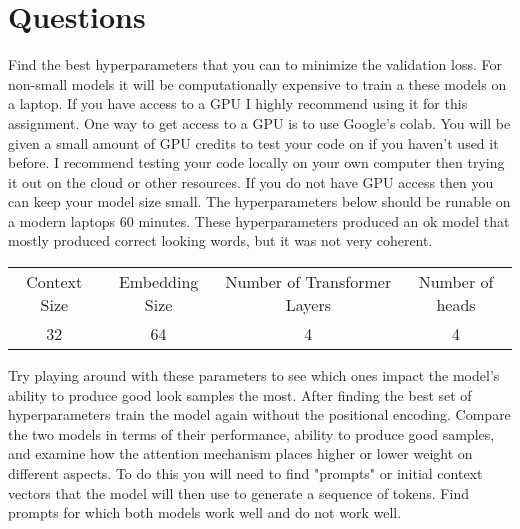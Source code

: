 \documentclass{article}
\begin{document}
\section{Questions}
Find the best hyperparameters that you can to minimize the validation loss. For non-small models it will be computationally expensive to train a these models on a laptop. If you have access to a GPU I highly recommend using it for this assignment. One way to get access to a GPU is to use Google's colab. You will be given a small amount of GPU credits to test your code on if you haven't used it before. I recommend testing your code locally on your own computer then trying it out on the cloud or other resources. If you do not have GPU access then you can keep your model size small. The hyperparameters below should be runable on a modern laptops 60 minutes. These hyperparameters produced an ok model that mostly produced correct looking words, but it was not very coherent. 
\begin{center}
\begin{tabular}{c|c|c|c}
    Context Size & Embedding Size & Number of Transformer Layers & Number of heads \\
    32 & 64 & 4 & 4 
\end{tabular}
\end{center}
Try playing around with these parameters to see which ones impact the model's ability to produce good look samples the most. 
%
After finding the best set of hyperparameters train the model again without the positional encoding. Compare the two models in terms of their performance, ability to produce good samples, and examine how the attention mechanism places higher or lower weight on different aspects. To do this you will need to find "prompts" or initial context vectors that the model will then use to generate a sequence of tokens. Find prompts for which both models work well and do not work well. 
\end{document}
